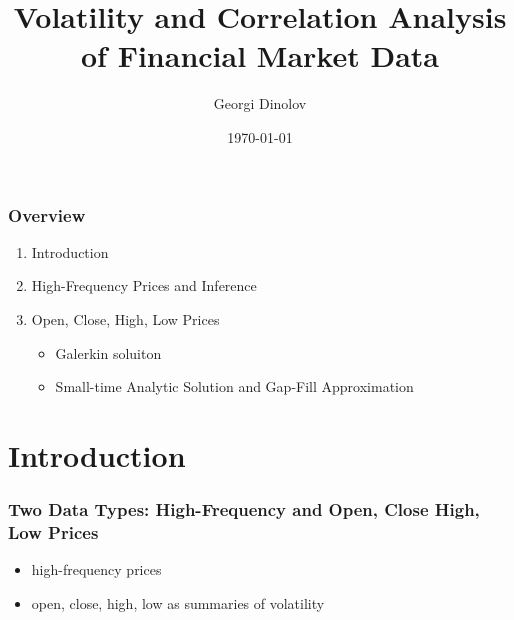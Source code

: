 \documentclass{beamer}
\title[]{Volatility and Correlation Analysis of Financial Market Data} %
\author{Georgi Dinolov} %
\institute[UCSC] %
{
University of California, Santa Cruz \\ %
\medskip
\textit{gdinolov@soe.ucsc.edu} %
}
\date{\today} %
\begin{document}
\begin{frame}
\titlepage %
\end{frame}

\begin{frame}
\frametitle{Overview} %
\begin{enumerate}
\item Introduction
\item High-Frequency Prices and Inference
\item Open, Close, High, Low Prices
  \begin{itemize}
  \item Galerkin soluiton
  \item Small-time Analytic Solution and Gap-Fill Approximation
  \end{itemize}
\end{enumerate}
\end{frame}


\section{Introduction}

\begin{frame}
\frametitle{Two Data Types: High-Frequency and Open, Close High, Low Prices}
\begin{itemize}
  \item high-frequency prices
  \item open, close, high, low as summaries of volatility
\end{itemize}
\end{frame}

\end{document}
